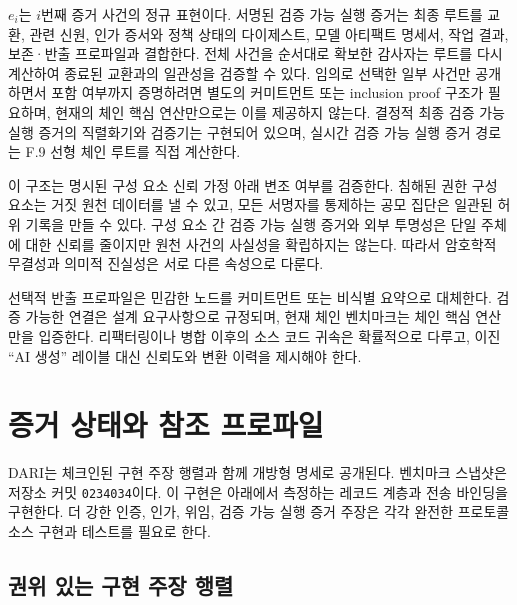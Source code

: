 \documentclass[10pt]{article}
\begin{document}
$e_i$는 $i$번째 증거 사건의 정규 표현이다. 서명된 검증 가능 실행 증거는 최종 루트를 교환, 관련 신원, 인가 증서와 정책 상태의 다이제스트, 모델 아티팩트 명세서, 작업 결과, 보존·반출 프로파일과 결합한다. 전체 사건을 순서대로 확보한 감사자는 루트를 다시 계산하여 종료된 교환과의 일관성을 검증할 수 있다. 임의로 선택한 일부 사건만 공개하면서 포함 여부까지 증명하려면 별도의 커미트먼트 또는 inclusion proof 구조가 필요하며, 현재의 체인 핵심 연산만으로는 이를 제공하지 않는다. 결정적 최종 검증 가능 실행 증거의 직렬화기와 검증기는 구현되어 있으며, 실시간 검증 가능 실행 증거 경로는 F.9 선형 체인 루트를 직접 계산한다.

이 구조는 명시된 구성 요소 신뢰 가정 아래 변조 여부를 검증한다. 침해된 권한 구성 요소는 거짓 원천 데이터를 낼 수 있고, 모든 서명자를 통제하는 공모 집단은 일관된 허위 기록을 만들 수 있다. 구성 요소 간 검증 가능 실행 증거와 외부 투명성은 단일 주체에 대한 신뢰를 줄이지만 원천 사건의 사실성을 확립하지는 않는다. 따라서 암호학적 무결성과 의미적 진실성은 서로 다른 속성으로 다룬다.

선택적 반출 프로파일은 민감한 노드를 커미트먼트 또는 비식별 요약으로 대체한다. 검증 가능한 연결은 설계 요구사항으로 규정되며, 현재 체인 벤치마크는 체인 핵심 연산만을 입증한다. 리팩터링이나 병합 이후의 소스 코드 귀속은 확률적으로 다루고, 이진 ``AI 생성'' 레이블 대신 신뢰도와 변환 이력을 제시해야 한다.

\section{증거 상태와 참조 프로파일}
\label{sec:implementation}

DARI는 체크인된 구현 주장 행렬과 함께 개방형 명세로 공개된다. 벤치마크 스냅샷은 저장소 커밋 \texttt{0234034}이다. 이 구현은 아래에서 측정하는 레코드 계층과 전송 바인딩을 구현한다. 더 강한 인증, 인가, 위임, 검증 가능 실행 증거 주장은 각각 완전한 프로토콜 소스 구현과 테스트를 필요로 한다.

\subsection{권위 있는 구현 주장 행렬}
\end{document}
